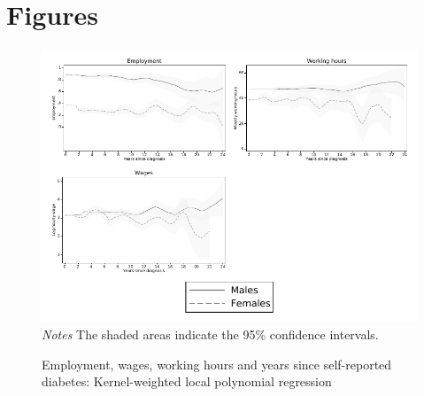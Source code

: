 \documentclass[12pt,english]{article}
\providecommand{\DIFaddbegin}{} %
\providecommand{\DIFaddend}{} %
\begin{document}
\setcounter{figure}{0}
\DIFaddbegin \setcounter{page}{1}
\DIFaddend \renewcommand{\thefigure}{\arabic{figure}}
\section*{Figures}


\begin{figure}[!ht]
	\caption{\label{fig:Kernel-weighted-local-polynomial_comb}Employment, wages, working hours and years since self-reported diabetes:  Kernel-weighted local polynomial regression}%
	\begin{center}
		\includegraphics[width=\linewidth]{figures/lpoly_combined.pdf}\\
		\footnotesize{\textit{Notes} The shaded areas indicate the 95\% confidence intervals.}
	\end{center}
\end{figure}
\end{document}
